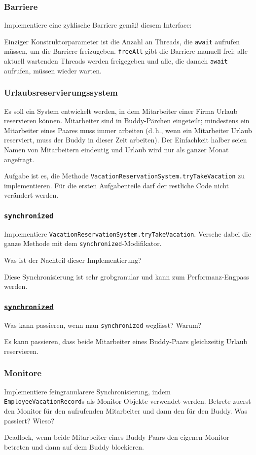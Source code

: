 \documentclass{beamer}
\begin{document}
\begin{frame}
  \frametitle{Barriere}
  Implementiere eine zyklische Barriere gemäß diesem Interface:
  
  Einziger Konstruktorparameter ist die Anzahl an Threads,
  die \lstinline{await} aufrufen müssen,
  um die Barriere freizugeben.
  \lstinline{freeAll} gibt die Barriere manuell frei;
  alle aktuell wartenden Threads werden freigegeben
  und alle, die danach \lstinline{await} aufrufen,
  müssen wieder warten.
\end{frame}

\begin{frame}
  \frametitle{Urlaubsreservierungssystem}
  Es soll ein System entwickelt werden,
  in dem Mitarbeiter einer Firma Urlaub reservieren können.
  Mitarbeiter sind in Buddy-Pärchen eingeteilt;
  mindestens ein Mitarbeiter eines Paares muss immer arbeiten
  (d.\,h., wenn ein Mitarbeiter Urlaub reserviert,
  muss der Buddy in dieser Zeit arbeiten).
  Der Einfachkeit halber seien Namen von Mitarbeitern eindeutig und Urlaub wird nur als ganzer Monat angefragt.
  
  Aufgabe ist es, die Methode \lstinline{VacationReservationSystem.tryTakeVacation} zu implementieren.
  Für die ersten Aufgabenteile darf der restliche Code nicht verändert werden.
\end{frame}

\begin{frame}
  \frametitle{\lstinline{synchronized}}
  Implementiere \lstinline{VacationReservationSystem.tryTakeVacation}.
  Versehe dabei die ganze Methode mit dem \lstinline{synchronized}-Modifikator.

  Was ist der Nachteil dieser Implementierung?
  
  \pause
  Diese Synchronisierung ist sehr grobgranular und kann zum Performanz-Engpass werden.
\end{frame}

\begin{frame}
  \frametitle{\sout{\lstinline{synchronized}}}
  Was kann passieren, wenn man \lstinline{synchronized} weglässt? Warum?
  
  \pause
  Es kann passieren, dass beide Mitarbeiter eines Buddy-Paars gleichzeitig Urlaub reservieren.
\end{frame}

\begin{frame}
  \frametitle{Monitore}
  Implementiere feingranularere Synchronisierung, indem \lstinline{EmployeeVacationRecord}s als Monitor-Objekte verwendet werden.
  Betrete zuerst den Monitor für den aufrufenden Mitarbeiter und dann den für den Buddy.
  Was passiert? Wieso?
  
  \pause
  Deadlock, wenn beide Mitarbeiter eines Buddy-Paars den eigenen Monitor betreten und dann auf dem Buddy blockieren.
\end{frame}
\end{document}
